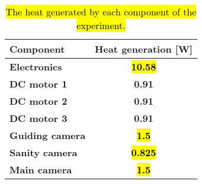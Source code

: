 
\begin{center}
\begin{table}
\centering
 \begin{tabular}{ | l | c | }
    \hline
    \textbf{Component} & \textbf{Heat generation [W]}\\ 
    \hline
    \textbf{Electronics}  & \textbf{\hl{10.58}} \\ 
    \hline
    \textbf{DC motor 1}  & \textbf{0.91} \\
    \hline
    \textbf{DC motor 2}  & \textbf{0.91} \\ 
    \hline
    \textbf{DC motor 3}  & \textbf{0.91} \\
    \hline
    \textbf{Guiding camera}  & \textbf{\hl{1.5}} \\
    \hline
    \textbf{Sanity camera}  & \textbf{\hl{0.825}} \\ 
    \hline
    \textbf{Main camera}  & \textbf{\hl{1.5}}\\ 
    \hline
  \end{tabular}
\caption{\hl{The heat generated by each component of the experiment.}}
\end{table}
\label{tab: heat generated}
\end{center}
